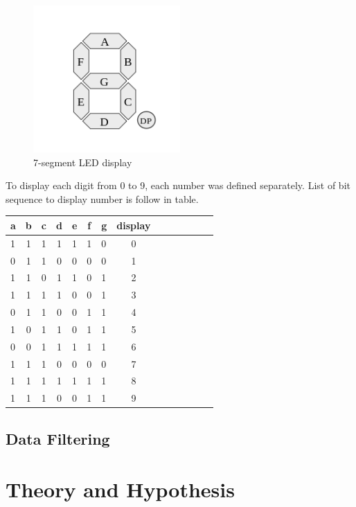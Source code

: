 \documentclass{article}
\begin{document}
\begin{figure}[h]
\begin{center}
\includegraphics[width=0.50\textwidth]{7segment} %
\caption{7-segment LED display}
\end{center}
\end{figure}
To display each digit from 0 to 9, each number was defined separately. List of bit sequence to display number is follow in table.
\begin{center}
\begin{tabular}{lclclclclclc|cl}
a&b&c&d&e&f&g&display\\
\hline
1&1&1&1&1&1&0&0\\
0&1&1&0&0&0&0&1\\
1&1&0&1&1&0&1&2\\
1&1&1&1&0&0&1&3\\
0&1&1&0&0&1&1&4\\
1&0&1&1&0&1&1&5\\
0&0&1&1&1&1&1&6\\
1&1&1&0&0&0&0&7\\
1&1&1&1&1&1&1&8\\
1&1&1&0&0&1&1&9
\end{tabular}
\end{center}

\subsection{Data Filtering}

\section{Theory and Hypothesis}
\end{document}
